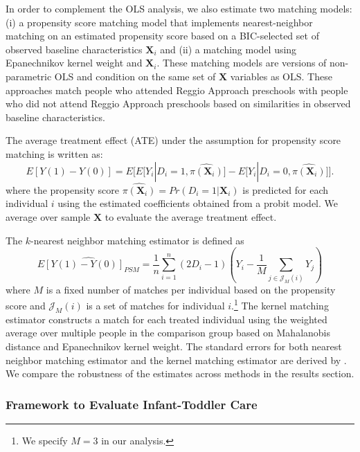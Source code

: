 In order to complement the OLS analysis, we also estimate two matching models: (i) a propensity score matching model that implements nearest-neighbor matching on an estimated propensity score based on a BIC-selected set of observed baseline characteristics $\boldsymbol{X}_i$ and (ii) a  matching model using Epanechnikov kernel weight and $\boldsymbol{X}_i$. These matching models are versions of non-parametric OLS and condition on the same set of $\bm{X}$ variables as OLS. These approaches match people who attended Reggio Approach preschools with people who did not attend Reggio Approach preschools based on similarities in observed baseline characteristics. 

The average treatment effect (ATE) under the assumption for propensity score matching is written as:
\begin{equation} \label{eq:ATE-PSM}
E[Y(1)-Y(0)] = E\bigg[E\big[Y_i|D_i=1, \hat{\pi(\boldsymbol{X}_i)}\big] - E\big[Y_i|D_i=0, \hat{\pi(\boldsymbol{X}_i)}\big]\bigg].
\end{equation}
where the propensity score $\hat{\pi({\boldsymbol{X}_i})} = Pr(D_i=1|\boldsymbol{X}_i)$ is predicted for each individual $i$ using the estimated coefficients obtained from a probit model. We average over sample $\bm{X}$ to evaluate the average treatment effect.

The $k$-nearest neighbor matching estimator is defined as
\begin{equation} \label{eq:PSM-estimator}
\widehat{E[Y(1)-Y(0)]_{PSM}} = \frac{1}{n} \sum_{i=1}^{n} (2D_i -1)(Y_i - \frac{1}{M}\sum_{j \in \mathcal{J}_M(i)}Y_j )
\end{equation}
where $M$ is a fixed number of matches per individual based on the propensity score and $\mathcal{J}_M(i)$ is a set of matches for individual $i$.\footnote{We specify $M = 3$ in our analysis.} The kernel matching estimator constructs a match for each treated individual using the weighted average over multiple people in the comparison group based on Mahalanobis distance and Epanechnikov kernel weight. The standard errors for both nearest neighbor matching estimator and the kernel matching estimator are derived by \cite{Abadie_Imbens_2006_Econometrica}. We compare the robustness of the estimates across methods in the results section.


\subsubsection{Framework to Evaluate Infant-Toddler Care}
\label{subsubsection:itc}

